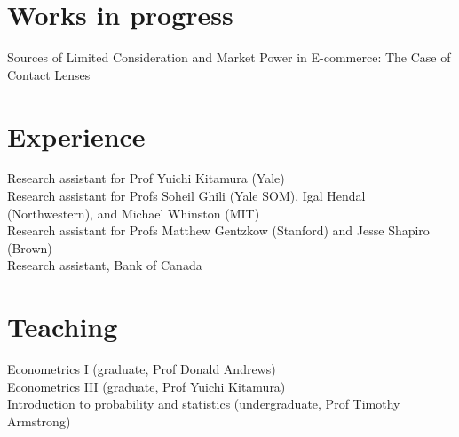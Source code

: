 \documentclass[11pt]{article} %
\begin{document}
\section*{Works in progress}

Sources of Limited Consideration and Market Power in E-commerce: The Case of
Contact Lenses

\section*{Experience}

 Research assistant for Prof Yuichi Kitamura (Yale) \\
 Research assistant for Profs Soheil Ghili (Yale SOM), Igal Hendal (Northwestern), and Michael Whinston (MIT) \\
  Research assistant for Profs Matthew Gentzkow (Stanford) and Jesse Shapiro (Brown) \\
 Research assistant, Bank of Canada \\

\section*{Teaching}

 Econometrics I (graduate, Prof Donald Andrews) \\
 Econometrics III (graduate, Prof Yuichi Kitamura) \\
 Introduction to probability and statistics (undergraduate, Prof Timothy Armstrong)



\vfill %
\end{document}
